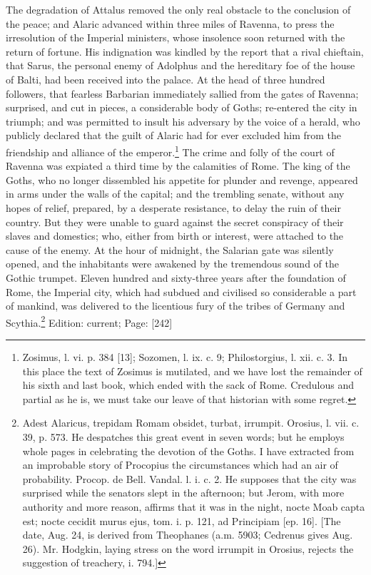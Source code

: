 The degradation of Attalus removed the only real obstacle to the conclusion of the peace; and Alaric advanced within three miles of Ravenna, to press the irresolution of the Imperial ministers, whose insolence soon returned with the return of fortune. His indignation was kindled by the report that a rival chieftain, that Sarus, the personal enemy of Adolphus and the hereditary foe of the house of Balti, had been received into the palace. At the head of three hundred followers, that fearless Barbarian immediately sallied from the gates of Ravenna; surprised, and cut in pieces, a considerable body of Goths; re-entered the city in triumph; and was permitted to insult his adversary by the voice of a herald, who publicly declared that the guilt of Alaric had for ever excluded him from the friendship and alliance of the emperor.\footnote{Zosimus, l. vi. p. 384 [13]; Sozomen, l. ix. c. 9; Philostorgius, l. xii. c. 3. In this place the text of Zosimus is mutilated, and we have lost the remainder of his sixth and last book, which ended with the sack of Rome. Credulous and partial as he is, we must take our leave of that historian with some regret.} The crime and folly of the court of Ravenna was expiated a third time by the calamities of Rome. The king of the Goths, who no longer dissembled his appetite for plunder and revenge, appeared in arms under the walls of the capital; and the trembling senate, without any hopes of relief, prepared, by a desperate resistance, to delay the ruin of their country. But they were unable to guard against the secret conspiracy of their slaves and domestics; who, either from birth or interest, were attached to the cause of the enemy. At the hour of midnight, the Salarian gate was silently opened, and the inhabitants were awakened by the tremendous sound of the Gothic trumpet. Eleven hundred and sixty-three years after the foundation of Rome, the Imperial city, which had subdued and civilised so considerable a part of mankind, was delivered to the licentious fury of the tribes of Germany and Scythia.\footnote{Adest Alaricus, trepidam Romam obsidet, turbat, irrumpit. Orosius, l. vii. c. 39, p. 573. He despatches this great event in seven words; but he employs whole pages in celebrating the devotion of the Goths. I have extracted from an improbable story of Procopius the circumstances which had an air of probability. Procop. de Bell. Vandal. l. i. c. 2. He supposes that the city was surprised while the senators slept in the afternoon; but Jerom, with more authority and more reason, affirms that it was in the night, nocte Moab capta est; nocte cecidit murus ejus, tom. i. p. 121, ad Principiam [ep. 16]. [The date, Aug. 24, is derived from Theophanes (a.m. 5903; Cedrenus gives Aug. 26). Mr. Hodgkin, laying stress on the word irrumpit in Orosius, rejects the suggestion of treachery, i. 794.]}
Edition: current; Page: [242]

